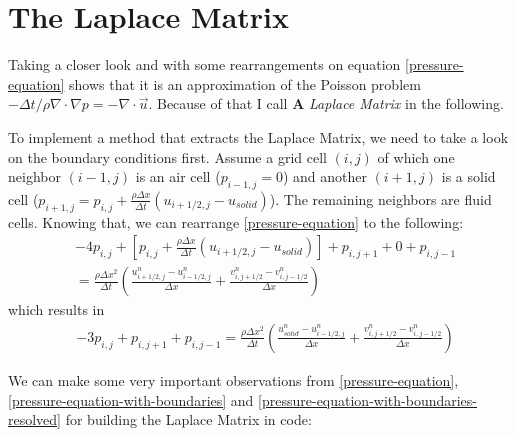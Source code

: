 \section{ The Laplace Matrix }
Taking a closer look and with some rearrangements on equation \ref{pressure-equation} shows that it is an approximation of the Poisson problem $-\Delta t / \rho \nabla \cdot \nabla p = - \nabla \cdot \vec{u}$. Because of that I call $\mathbf{A}$ \textit{Laplace Matrix} in the following. 
\par To implement a method that extracts the Laplace Matrix, we need to take a look on the boundary conditions first. Assume a grid cell $(i,j)$ of which one neighbor $(i-1,j)$ is an air cell ($p_{i-1,j}=0$) and another $(i+1, j)$ is a solid cell ($p_{i+1,j}= p_{i,j} + \frac{\rho \Delta x}{\Delta t} (u_{i+1/2,j} - u_{solid})$). The remaining neighbors are fluid cells. Knowing that, we can rearrange \ref{pressure-equation} to the following:
\begin{equation} \label{pressure-equation-with-boundaries}
    \begin{aligned}
        & -4p_{i,j} + \left[p_{i,j} + \frac{\rho \Delta x}{\Delta t} (u_{i+1/2,j} - u_{solid}) \right] + p_{i,j+1} + 0 + p_{i,j-1} \\
        & = \frac{\rho \Delta x^2}{\Delta t} \left( \frac{u_{i+1/2,j}^{n} - u_{i-1/2,j}^{n}}{\Delta x} + \frac{v_{i,j+1/2}^{n} - v_{i,j-1/2}^{n}}{\Delta x} \right)
    \end{aligned}
\end{equation}
which results in
\begin{equation} \label{pressure-equation-with-boundaries-resolved}
    \begin{aligned}
        & - 3p_{i,j} + p_{i,j+1} + p_{i,j-1} = \frac{\rho \Delta x^2}{\Delta t} \left( \frac{u_{solid}^{n} - u_{i-1/2,j}^{n}}{\Delta x} + \frac{v_{i,j+1/2}^{n} - v_{i,j-1/2}^{n}}{\Delta x} \right)
    \end{aligned}
\end{equation}
\par We can make some very important observations from \ref{pressure-equation}, \ref{pressure-equation-with-boundaries} and \ref{pressure-equation-with-boundaries-resolved} for building the Laplace Matrix in code:
